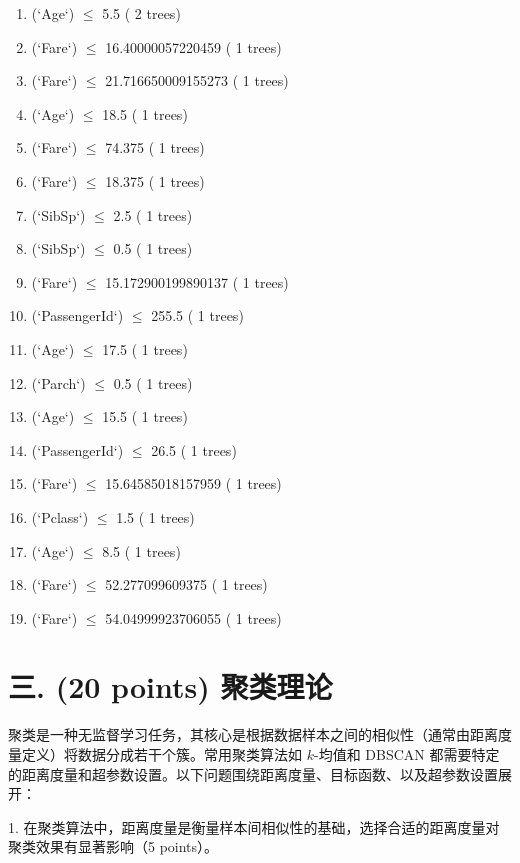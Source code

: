 \documentclass[8pt]{article}
\begin{document}
\begin{itemize}
\begin{itemize}
\begin{enumerate}
        \item (`Age`) $\le$ 5.5 ( 2 trees)
        \item (`Fare`) $\le$ 16.40000057220459 ( 1 trees)
        \item (`Fare`) $\le$ 21.716650009155273 ( 1 trees)
        \item (`Age`) $\le$ 18.5 ( 1 trees)
        \item (`Fare`) $\le$ 74.375 ( 1 trees)
        \item (`Fare`) $\le$ 18.375 ( 1 trees)
        \item (`SibSp`) $\le$ 2.5 ( 1 trees)
        \item (`SibSp`) $\le$ 0.5 ( 1 trees)
        \item (`Fare`) $\le$ 15.172900199890137 ( 1 trees)
        \item (`PassengerId`) $\le$ 255.5 ( 1 trees)
        \item (`Age`) $\le$ 17.5 ( 1 trees)
        \item (`Parch`) $\le$ 0.5 ( 1 trees)
        \item (`Age`) $\le$ 15.5 ( 1 trees)
        \item (`PassengerId`) $\le$ 26.5 ( 1 trees)
        \item (`Fare`) $\le$ 15.64585018157959 ( 1 trees)
        \item (`Pclass`) $\le$ 1.5 ( 1 trees)
        \item (`Age`) $\le$ 8.5 ( 1 trees)
        \item (`Fare`) $\le$ 52.277099609375 ( 1 trees)
        \item (`Fare`) $\le$ 54.04999923706055 ( 1 trees)
    \end{enumerate}
\end{itemize}

\end{itemize}




\vspace{3em}


\section*{三. (20 points) 聚类理论}

聚类是一种无监督学习任务，其核心是根据数据样本之间的相似性（通常由距离度量定义）将数据分成若干个簇。常用聚类算法如 \( k \)-均值和 DBSCAN 都需要特定的距离度量和超参数设置。以下问题围绕距离度量、目标函数、以及超参数设置展开：  

1. 
在聚类算法中，距离度量是衡量样本间相似性的基础，选择合适的距离度量对聚类效果有显著影响（5 points）。  
\end{document}
